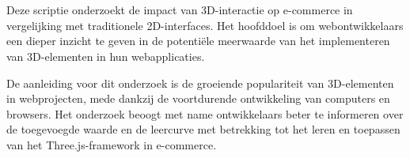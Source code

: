 
%
%
%
%
%

%



\chapter*{}

Deze scriptie onderzoekt de impact van 3D-interactie op e-commerce in vergelijking met traditionele 2D-interfaces. Het hoofddoel is om webontwikkelaars een dieper inzicht te geven in de potentiële meerwaarde van het implementeren van 3D-elementen in hun webapplicaties.

De aanleiding voor dit onderzoek is de groeiende populariteit van 3D-elementen in webprojecten, mede dankzij de voortdurende ontwikkeling van computers en browsers. Het onderzoek beoogt met name ontwikkelaars beter te informeren over de toegevoegde waarde en de leercurve met betrekking tot het leren en toepassen van het Three.js-framework in e-commerce.

